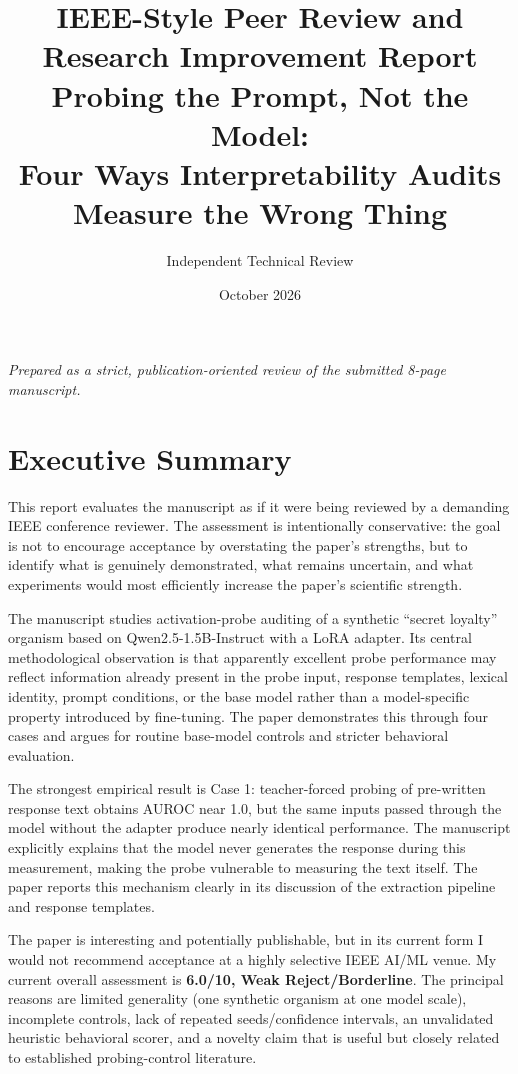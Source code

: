 \documentclass[11pt,a4paper]{article}
\title{\textbf{IEEE-Style Peer Review and Research Improvement Report}\\
\vspace{0.4em}
\large Probing the Prompt, Not the Model:\\
Four Ways Interpretability Audits Measure the Wrong Thing}
\author{Independent Technical Review}
\date{October 2026}
\begin{document}
\maketitle

\begin{center}
\textit{Prepared as a strict, publication-oriented review of the submitted 8-page manuscript.}
\end{center}

\section{Executive Summary}

This report evaluates the manuscript as if it were being reviewed by a demanding IEEE conference reviewer. The assessment is intentionally conservative: the goal is not to encourage acceptance by overstating the paper's strengths, but to identify what is genuinely demonstrated, what remains uncertain, and what experiments would most efficiently increase the paper's scientific strength.

The manuscript studies activation-probe auditing of a synthetic ``secret loyalty'' organism based on Qwen2.5-1.5B-Instruct with a LoRA adapter. Its central methodological observation is that apparently excellent probe performance may reflect information already present in the probe input, response templates, lexical identity, prompt conditions, or the base model rather than a model-specific property introduced by fine-tuning. The paper demonstrates this through four cases and argues for routine base-model controls and stricter behavioral evaluation.

The strongest empirical result is Case 1: teacher-forced probing of pre-written response text obtains AUROC near 1.0, but the same inputs passed through the model without the adapter produce nearly identical performance. The manuscript explicitly explains that the model never generates the response during this measurement, making the probe vulnerable to measuring the text itself. The paper reports this mechanism clearly in its discussion of the extraction pipeline and response templates. 

The paper is interesting and potentially publishable, but in its current form I would not recommend acceptance at a highly selective IEEE AI/ML venue. My current overall assessment is \textbf{6.0/10, Weak Reject/Borderline}. The principal reasons are limited generality (one synthetic organism at one model scale), incomplete controls, lack of repeated seeds/confidence intervals, an unvalidated heuristic behavioral scorer, and a novelty claim that is useful but closely related to established probing-control literature.
\end{document}
